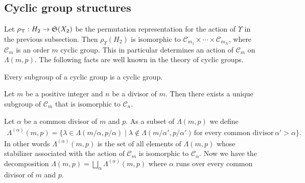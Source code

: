 \documentclass[pdftex]{sigma}
\begin{document}
\subsection{Cyclic group structures}\label{subsec:3_2}

Let $\rho_{\Upsilon}: H_2 \rightarrow {\frak S}(X_2)$ be
the permutation representation for the
action of $\Upsilon$ in the previous subsection.
Then
$\rho_{\Upsilon} (H_2)$ is isomorphic to $\mathcal{C}_{m_1} \times \cdots \times \mathcal{C}_{m_N}$, where
$\mathcal{C}_m$ is an order $m$ cyclic group.
This in particular determines an action of $\mathcal{C}_m$ on $\Lambda (m,p)$.
The following facts are well known in the theory of cyclic groups.
\begin{proposition}
Every subgroup of a cyclic group is a cyclic group.
\end{proposition}
\begin{proposition}
Let $m$ be a positive integer and $n$ be a divisor of $m$.
Then  there exists a unique subgroup of $\mathcal{C}_m$ that is isomorphic to $\mathcal{C}_n$.
\end{proposition}
Let $\alpha$ be a common divisor of $m$ and $p$.
As a subset of $\Lambda (m,p)$ %
we def\/ine
\begin{gather}\label{eq:may12_1}
\Lambda^{(\alpha)} (m,p) = \{
\lambda \in \Lambda (m/\alpha,p/\alpha) \mid
\lambda \notin \Lambda (m/\alpha',p/\alpha') \, \mbox{for every common divisor} \, \alpha' > \alpha  \}.\!\!
\end{gather}
In other words
$\Lambda^{(\alpha)} (m,p)$ is the set of all elements of $\Lambda (m,p)$
whose stabilizer associated with
the action of {$\mathcal{C}_m$}
is isomorphic to $\mathcal{C}_\alpha$.
Now we have the decomposition $\Lambda (m,p) = \bigsqcup_{\alpha} \Lambda^{(\alpha)}(m,p)$
where $\alpha$ runs over every common divisor of $m$ and $p$.
\end{document}

